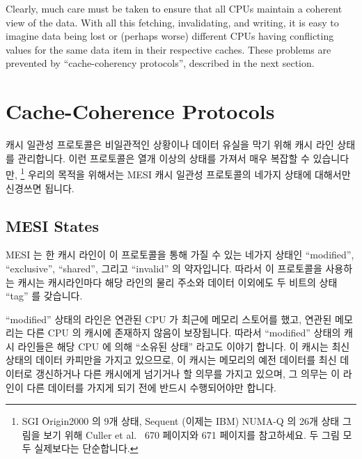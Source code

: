 Clearly, much care must be taken to ensure that all CPUs maintain
a coherent view of the data.
With all this fetching, invalidating, and writing, it is easy to
imagine data being lost or (perhaps worse) different CPUs having
conflicting values for the same data item in their respective
caches.
These problems are prevented by ``cache-coherency protocols'',
described in the next section.
\fi

\section{Cache-Coherence Protocols}
\label{sec:app:whymb:Cache-Coherence Protocols}

캐시 일관성 프로토콜은 비일관적인 상황이나 데이터 유실을 막기 위해 캐시 라인
상태를 관리합니다.
이런 프로토콜은 열개 이상의 상태를 가져서 매우 복잡할 수 있습니다만, \footnote{
	SGI Origin2000 의 9개 상태, Sequent (이제는 IBM) NUMA-Q 의 26개 상태
	그림을 보기 위해 Culler et al.~\cite{DavidECuller1999} 670 페이지와 671
	페이지를 참고하세요.
	두 그림 모두 실제보다는 단순합니다.}
우리의 목적을 위해서는 MESI 캐시 일관성 프로토콜의 네가지 상태에 대해서만
신경쓰면 됩니다.
\iffalse

Cache-coherency protocols manage cache-line states so as to prevent
inconsistent or lost data.
These protocols can be quite complex, with many tens
of states,\footnote{
	See Culler et al.~\cite{DavidECuller1999} pages 670 and 671
	for the nine-state and 26-state diagrams for SGI Origin2000
	and Sequent (now IBM) NUMA-Q, respectively.
	Both diagrams are significantly simpler than real life.}
but for our purposes we need only concern ourselves with the
four-state MESI cache-coherence protocol.
\fi

\subsection{MESI States}
\label{sec:app:whymb:MESI States}

MESI 는 한 캐시 라인이 이 프로토콜을 통해 가질 수 있는 네가지 상태인
``modified'', ``exclusive'', ``shared'', 그리고 ``invalid'' 의 약자입니다.
따라서 이 프로토콜을 사용하는 캐시는 캐시라인마다 해당 라인의 물리 주소와
데이터 이외에도 두 비트의 상태 ``tag'' 를 갖습니다.

``modified'' 상태의 라인은 연관된 CPU 가 최근에 메모리 스토어를 했고, 연관된
메모리는 다른 CPU 의 캐시에 존재하지 않음이 보장됩니다.
따라서 ``modified'' 상태의 캐시 라인들은 해당 CPU 에 의해 ``소유된 상태''
라고도 이야기 합니다.
이 캐시는 최신 상태의 데이터 카피만을 가지고 있으므로, 이 캐시는 메모리의 예전
데이터를 최신 데이터로 갱신하거나 다른 캐시에게 넘기거나 할 의무를 가지고
있으며, 그 의무는 이 라인이 다른 데이터를 가지게 되기 전에 반드시 수행되어야만
합니다.
\iffalse

